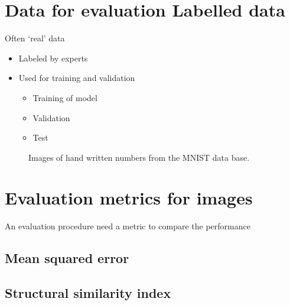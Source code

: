 \documentclass[letterpaper,10pt,english]{sphinxmanual}
\begin{document}
\section{Data for evaluation \sphinxhyphen{} Labelled data}
\label{\detokenize{02-ImageEnhancement:data-for-evaluation-labelled-data}}
\sphinxAtStartPar
Often ‘real’ data
\begin{itemize}
\item {} 
\sphinxAtStartPar
Labeled by experts

\item {} 
\sphinxAtStartPar
Used for training and validation
\begin{itemize}
\item {} 
\sphinxAtStartPar
Training of model

\item {} 
\sphinxAtStartPar
Validation

\item {} 
\sphinxAtStartPar
Test

\end{itemize}

\end{itemize}



\begin{figure}[htbp]
\centering
\capstart

\noindent{}
\caption{Images of hand written numbers from the MNIST data base.}\label{\detokenize{02-ImageEnhancement:id33}}\end{figure}


\section{Evaluation metrics for images}
\label{\detokenize{02-ImageEnhancement:evaluation-metrics-for-images}}
\sphinxAtStartPar
An evaluation procedure need a metric to compare the performance


\subsection{Mean squared error}
\label{\detokenize{02-ImageEnhancement:mean-squared-error}}



\subsection{Structural similarity index}
\label{\detokenize{02-ImageEnhancement:structural-similarity-index}}
\end{document}
